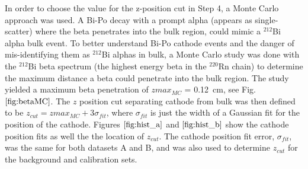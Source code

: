 In order to choose the value for the z-position cut in Step 4, a Monte Carlo approach was used. A Bi-Po decay with a prompt alpha (appears as single-scatter) where the beta penetrates into the bulk region, could mimic a $^{212}$Bi alpha bulk event. To better understand Bi-Po cathode events and the danger of mis-identifying them as $^{212}$Bi alphas in bulk, a Monte Carlo study was done with the $^{212}$Bi beta spectrum (the highest energy beta in the $^{220}$Rn chain) to determine the maximum distance a beta could penetrate into the bulk region. The study yielded a maximum beta penetration of $zmax_{MC}$ = 0.12~cm, see Fig. $\ref{fig:betaMC}$. 
The $z$ position cut separating cathode from bulk was then defined to be $z_{cut} = zmax_{MC} + 3\sigma_{fit}$, where $\sigma_{fit}$ is just the width of a Gaussian fit for the position of the cathode. Figures $\ref{fig:hist_a}$ and $\ref{fig:hist_b}$ show the cathode position fits as well the the location of $z_{cut}$. The cathode position fit error, $\sigma_{fit}$, was the same for both datasets A and B, and was also used to determine $z_{cut}$ for the background and calibration sets.

